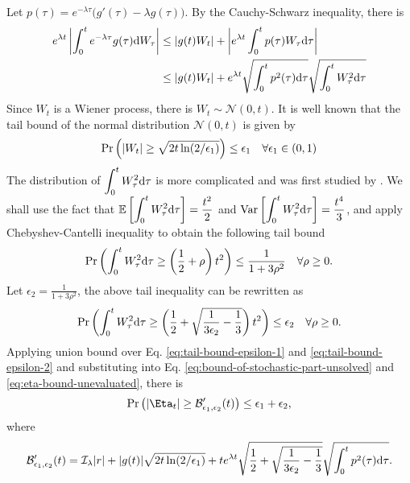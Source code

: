     Let $p(\tau) = e^{-\lambda\tau}\big(g'(\tau) - \lambda g(\tau)\big)$.
    By the Cauchy-Schwarz inequality, there is
    \begin{align}
        e^{\lambda t} \left|\int_0^t e^{-\lambda \tau} g(\tau) \d W_\tau\right| &\leq \left| g(t)W_t \right| + \left|e^{\lambda t} \int_{0}^{t} p(\tau) W_\tau \d \tau\right| \\
        &\leq \left| g(t)W_t \right| + e^{\lambda t} \sqrt{\int_{0}^{t} p^2(\tau) \d \tau} \sqrt{\int_{0}^{t} W_\tau^2 \d \tau}\label{eq:bound-of-stochastic-part-unsolved}
    \end{align}
    Since $W_t$ is a Wiener process, there is $W_t \sim \mathcal{N}(0, t)$.
    It is well known that the tail bound of the normal distribution $\mathcal{N}(0, t)$ is given by
    \begin{equation}\label{eq:tail-bound-epsilon-1}
        \P{|W_t| \geq \sqrt{2t\ln(2/\epsilon_1)}} \leq \epsilon_1 \quad \forall \epsilon_1 \in (0, 1)
    \end{equation}
    The distribution of $\displaystyle \int_{0}^{t} W_\tau^2 \d \tau$ is more complicated and was first studied by \citeauthor{cameron1944transformations} \cite{cameron1944transformations}.
    We shall use the fact that $\displaystyle \E{\int_{0}^{t}W_\tau^2\d \tau} = \frac{t^2}{2}$ and $\displaystyle \mathrm{Var}\left[\int_{0}^{t}W_\tau^2\d \tau\right] = \frac{t^4}{3}$, and apply Chebyshev-Cantelli inequality to obtain the following tail bound
    \begin{equation}
        \P{\int_0^t W_\tau^2 \d \tau \geq \left(\frac{1}{2}+\rho\right)t^2} \leq \frac{1}{1+3\rho^2} \quad \forall \rho \geq 0.
    \end{equation}
    Let $\epsilon_2 = \frac{1}{1 + 3\rho^2}$, the above tail inequality can be rewritten as
    \begin{equation}\label{eq:tail-bound-epsilon-2}
        \P{\int_{0}^{t} W_\tau^2 \d \tau \geq \left(\frac{1}{2}+\sqrt{\frac{1}{3\epsilon_2} - \frac{1}{3}}\right)t^2} \leq \epsilon_2 \quad \forall \rho \geq 0.
    \end{equation}
    Applying union bound over Eq. \eqref{eq:tail-bound-epsilon-1} and \eqref{eq:tail-bound-epsilon-2} and substituting into Eq. \eqref{eq:bound-of-stochastic-part-unsolved} and \eqref{eq:eta-bound-unevaluated}, there is 
    \begin{equation}
        \P{|\Eta_t| \geq \Bound'_{\epsilon_1, \epsilon_2}(t)} \leq \epsilon_1 + \epsilon_2,
    \end{equation}
    where
    \begin{gather}\label{eq:bound-two-epsilon}
        \Bound'_{\epsilon_1, \epsilon_2} (t) = \I_{\lambda} |r| + |g(t)|\sqrt{2t\ln(2/\epsilon_1)}+ te^{\lambda t} \sqrt{\frac{1}{2}+\sqrt{\frac{1}{3\epsilon_2} - \frac{1}{3}}} \sqrt{\int_{0}^{t} p^2(\tau) \d \tau}.
    \end{gather}
